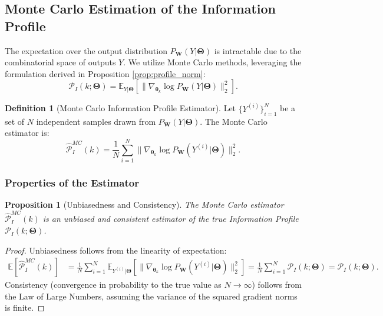 \documentclass{article}
\newtheorem{proposition}[theorem]{Proposition}
\theoremstyle{definition}
\newtheorem{definition}[theorem]{Definition}
\begin{document}
\subsection{Monte Carlo Estimation of the Information Profile}
The expectation over the output distribution $P_{\mathbf{W}}(Y|\mathbf{\Theta})$ is intractable due to the combinatorial space of outputs $Y$. We utilize Monte Carlo methods, leveraging the formulation derived in Proposition \ref{prop:profile_norm}:
\begin{equation}
    \mathcal{P}_I(k; \mathbf{\Theta}) = \mathbb{E}_{Y|\mathbf{\Theta}}[\|\nabla_{\boldsymbol{\theta}_k} \log P_{\mathbf{W}}(Y|\mathbf{\Theta})\|_2^2].
\end{equation}

\begin{definition}[Monte Carlo Information Profile Estimator]
Let $\{Y^{(i)}\}_{i=1}^N$ be a set of $N$ independent samples drawn from $P_{\mathbf{W}}(Y|\mathbf{\Theta})$. The Monte Carlo estimator is:
\begin{equation}
    \hat{\mathcal{P}}_I^{MC}(k) = \frac{1}{N} \sum_{i=1}^N \|\nabla_{\boldsymbol{\theta}_k} \log P_{\mathbf{W}}(Y^{(i)}|\mathbf{\Theta})\|_2^2.
\end{equation}
\end{definition}

\subsubsection{Properties of the Estimator}

\begin{proposition}[Unbiasedness and Consistency]
The Monte Carlo estimator $\hat{\mathcal{P}}_I^{MC}(k)$ is an unbiased and consistent estimator of the true Information Profile $\mathcal{P}_I(k; \mathbf{\Theta})$.
\end{proposition}
\begin{proof}
Unbiasedness follows from the linearity of expectation:
\begin{align}
    \mathbb{E}[\hat{\mathcal{P}}_I^{MC}(k)] &= \frac{1}{N} \sum_{i=1}^N \mathbb{E}_{Y^{(i)}|\mathbf{\Theta}}[\|\nabla_{\boldsymbol{\theta}_k} \log P_{\mathbf{W}}(Y^{(i)}|\mathbf{\Theta})\|_2^2] = \frac{1}{N} \sum_{i=1}^N \mathcal{P}_I(k; \mathbf{\Theta}) = \mathcal{P}_I(k; \mathbf{\Theta}).
\end{align}
Consistency (convergence in probability to the true value as $N \to \infty$) follows from the Law of Large Numbers, assuming the variance of the squared gradient norms is finite.
\end{proof}
\end{document}
